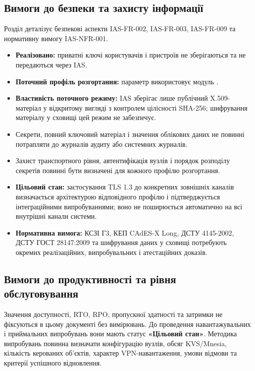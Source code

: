 \documentclass{article}
\begin{document}
\subsection{Вимоги до безпеки та захисту інформації}
Розділ деталізує безпекові аспекти IAS-FR-002, IAS-FR-003, IAS-FR-009 та нормативну вимогу IAS-NFR-001.
\begin{itemize}
    \item \textbf{Реалізовано:} приватні ключі користувачів і пристроїв не зберігаються та не передаються через IAS.
    \item \textbf{Поточний профіль розгортання:} параметр  використовує модуль .
    \item \textbf{Властивість поточного режиму:} IAS зберігає лише публічний X.509-матеріал у відкритому вигляді з контролем цілісності SHA-256; шифрування матеріалу у сховищі цей режим не забезпечує.
    \item Секрети, повний ключовий матеріал і значення облікових даних не повинні потрапляти до журналів аудиту або системних журналів.
    \item Захист транспортного рівня, автентифікація вузлів і порядок розподілу секретів повинні бути визначені для кожного профілю розгортання.
    \item \textbf{Цільовий стан:} застосування TLS 1.3 до конкретних зовнішніх каналів визначається архітектурою відповідного профілю і підтверджується інтеграційними випробуваннями; воно не поширюється автоматично на всі внутрішні канали системи.
    \item \textbf{Нормативна вимога:} КСЗІ Г3, КЕП CAdES-X Long, ДСТУ 4145-2002, ДСТУ ГОСТ 28147:2009 та шифрування даних у сховищі потребують окремих реалізаційних, випробувальних і атестаційних доказів.
\end{itemize}

\subsection{Вимоги до продуктивності та рівня обслуговування}
Значення доступності, RTO, RPO, пропускної здатності та затримки не фіксуються в цьому документі без вимірювань. До проведення навантажувальних і приймальних випробувань вони мають статус \textbf{«Цільовий стан»}. Методика випробувань повинна визначати конфігурацію вузлів, обсяг KVS/Mnesia, кількість керованих об'єктів, характер VPN-навантаження, умови відмови та критерії успішного відновлення.
\end{document}
